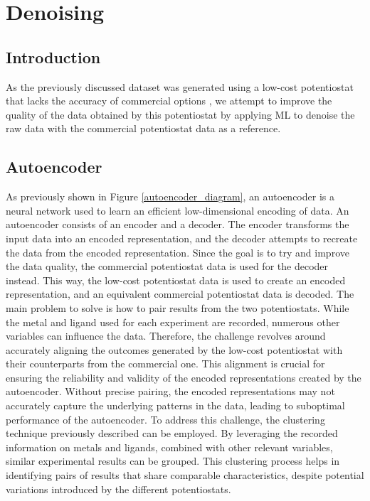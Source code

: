 \chapter{Denoising} \label{chap:chap-4}

\section{Introduction}
As the previously discussed dataset was generated using a low-cost potentiostat that lacks the accuracy of commercial options \cite{PabloGarca2024}, we attempt to improve the quality of the data obtained by this potentiostat by applying ML to denoise the raw data with the commercial potentiostat data as a reference.
\section{Autoencoder}
As previously shown in Figure \ref{autoencoder_diagram}, an autoencoder is a neural network used to learn an efficient low-dimensional encoding of data. An autoencoder consists of an encoder and a decoder. The encoder transforms the input data into an encoded representation, and the decoder attempts to recreate the data from the encoded representation. Since the goal is to try and improve the data quality, the commercial potentiostat data is used for the decoder instead. This way, the low-cost potentiostat data is used to create an encoded representation, and an equivalent commercial potentiostat data is decoded. The main problem to solve is how to pair results from the two potentiostats. While the metal and ligand used for each experiment are recorded, numerous other variables can influence the data. Therefore, the challenge revolves around accurately aligning the outcomes generated by the low-cost potentiostat with their counterparts from the commercial one. This alignment is crucial for ensuring the reliability and validity of the encoded representations created by the autoencoder. Without precise pairing, the encoded representations may not accurately capture the underlying patterns in the data, leading to suboptimal performance of the autoencoder. To address this challenge, the clustering technique previously described can be employed. By leveraging the recorded information on metals and ligands, combined with other relevant variables, similar experimental results can be grouped. This clustering process helps in identifying pairs of results that share comparable characteristics, despite potential variations introduced by the different potentiostats.
